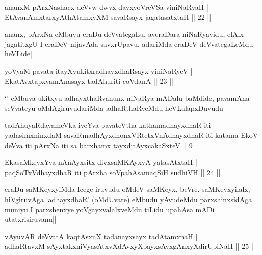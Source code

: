 
\begin{shl}
ananxM pArxNashacx deVvw dwvx davxyoVreVSa viniNaRyaH |\\
EtAvanAmxtarxyAthAtamxyXM savaRsayx jagatasatxtaH \hfill || 22 ||
\end{shl}

\begin{artha}
ananx, pArxNa eMbuvu eraDu deVvategaLu, averaDara niNaRyavidu, elAlx jagatitxgU I eraDeV nijavAda savxrUpavu. adariMda eraDeV deVvategaLeMdu heVLide||
\end{artha}

\begin{shl}
yoV\s yaM pavata itayXyukitxradhayxdhaRsayx viniNaRyeV |\\
EkatAvxtapxvamAnasayx tadAhuriti coVdanA \hfill || 23 ||
\end{shl}

\begin{artha}%
`\stext ' eMbuva ukitxyu adhayxthaRvanunx niNaRya mADalu baMdide, pavamAna seVvateyu oMdAgiruvudariMda adhaRthaRveMdu heVLalapxDuvudu||
\end{artha}

\begin{shl}
tadAhuyaRdayameVka iveYva pavateV\s tha kathamadhayxdhaR iti yadasimxninxdaM savaRmadhAyxdhonxVRtetxVnAdhayxdhaR iti katama EkoV deVva iti pArxNa iti sa barxhamx tayxditAyxcakaSxteV || 9 ||
\end{shl}

\begin{shl}
EkasaMkeyxYva nAnAyx\s sitx divxsaMKAyxyA yatasAtxtaH |\\
paqSoTxV\s dhayxdhaR iti pArxha soVpahAsamaqSiH sudhiVH \hfill || 24 ||
\end{shl}

\begin{artha}
eraDu saMKeyxyiMda Icege iruvudu oMdeV saMKeyx, beVre. saMKeyxyilalx, hiVgiruvAga `adhayxdhaR' (oMdUvare) eMbudu yAvudeMdu parxshinxsidAga muniyu I parxshenxye yoVgayxvalalxveMdu tiLidu upahAsa mADi utatxrisiruvanu||
\end{artha}

\begin{shl}
vAyuvAR deVvatA kaqtAsxnX tadanayxsayx tadAtamxnaH |\\
adhaRtavxM sAyxtakxniVyasAtxvXdAvxyXpayxsAyxgAnxyXdirUpiNaH \hfill || 25 ||
\end{shl}

